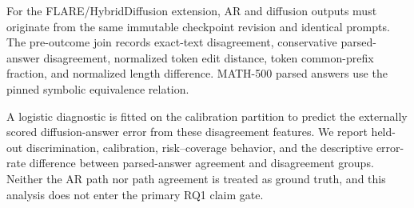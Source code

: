 For the FLARE/HybridDiffusion extension, AR and diffusion outputs must originate
from the same immutable checkpoint revision and identical prompts.
The pre-outcome join records exact-text disagreement, conservative parsed-answer
disagreement, normalized token edit distance, token common-prefix fraction, and
normalized length difference. MATH-500 parsed answers use the pinned symbolic
equivalence relation.

A logistic diagnostic is fitted on the calibration partition to predict the
externally scored diffusion-answer error from these disagreement features.
We report held-out discrimination, calibration, risk--coverage behavior, and
the descriptive error-rate difference between parsed-answer agreement and
disagreement groups. Neither the AR path nor path agreement is treated as
ground truth, and this analysis does not enter the primary RQ1 claim gate.
